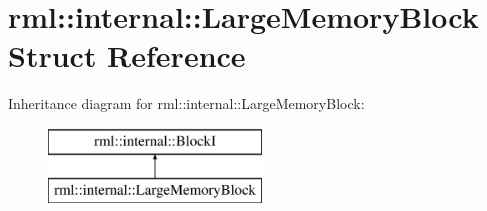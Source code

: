 \hypertarget{structrml_1_1internal_1_1LargeMemoryBlock}{}\section{rml\+:\+:internal\+:\+:Large\+Memory\+Block Struct Reference}
\label{structrml_1_1internal_1_1LargeMemoryBlock}
Inheritance diagram for rml\+:\+:internal\+:\+:Large\+Memory\+Block\+:\begin{figure}[H]
\begin{center}
\leavevmode
\includegraphics[height=2.000000cm]{structrml_1_1internal_1_1LargeMemoryBlock}
\end{center}
\end{figure}
